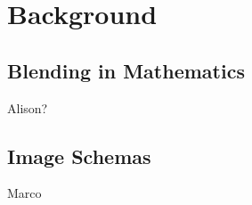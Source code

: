 \section{Background}
\label{sec:background}

\subsection{Blending in Mathematics}
\label{subsec:mathblend}

  Alison?

\subsection{Image Schemas}  
\label{subsec:schemas}

Marco

